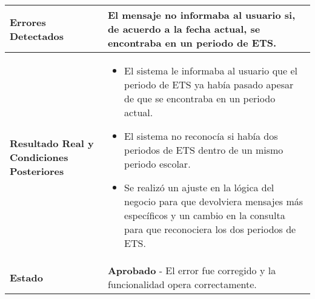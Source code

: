 \begin{longtable}{|p{5cm}|p{10cm}|}
	\\
	\hline
	\textbf{Errores Detectados} & 
	El mensaje no informaba al usuario si, de acuerdo a la fecha actual, se encontraba en un periodo de ETS. \\
	\hline
	\textbf{Resultado Real y Condiciones Posteriores} & 
	\begin{itemize}
		\item El sistema le informaba al usuario que el periodo de ETS ya había pasado apesar de que se encontraba en un periodo actual.
		\item El sistema no reconocía si había dos periodos de ETS dentro de un mismo periodo escolar.
		\item Se realizó un ajuste en la lógica del negocio para que devolviera mensajes más específicos y un cambio en la consulta para que reconociera los dos periodos de ETS.
	\end{itemize} \\
	\hline
	\textbf{Estado} & 
	\textbf{Aprobado} - El error fue corregido y la funcionalidad opera correctamente.   \\
	\hline
\end{longtable}